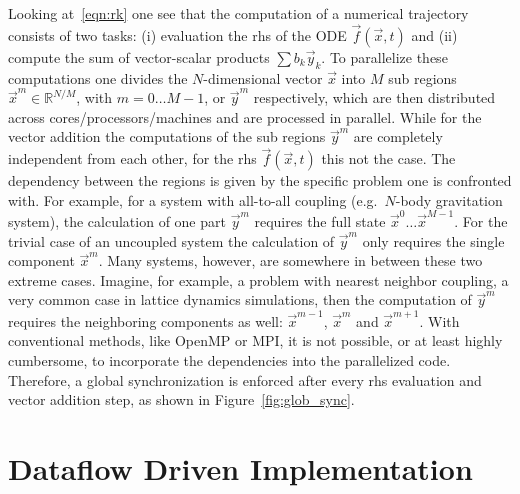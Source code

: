 \documentclass[10pt]{scrartcl}
\begin{document}
Looking at~\eqref{eqn:rk} one see that the computation of a numerical trajectory consists of two tasks: (i) evaluation the rhs of the ODE $\vec f(\vec x,t)$ and (ii) compute the sum of vector-scalar products $\sum b_k \vec y_k$.
To parallelize these computations one divides the $N$-dimensional vector $\vec x$ into $M$ sub regions $\vec x^{m}\in \mathbb{R}^{N/M}$, with $m=0\dots M-1$, or $\vec y^{m}$ respectively, which are then distributed across cores/processors/machines and are processed in parallel.
While for the vector addition the computations of the sub regions $\vec y^m$ are completely independent from each other, for the rhs $\vec f(\vec x , t)$ this not the case.
The dependency between the regions is given by the specific problem one is confronted with.
For example, for a system with all-to-all coupling (e.g.\ $N$-body gravitation system), the calculation of one part $\vec y^m$ requires the full state $\vec x^{0}\dots \vec x^{M-1}$.
For the trivial case of an uncoupled system the calculation of $\vec y^m$ only requires the single component $\vec x^m$.
Many systems, however, are somewhere in between these two extreme cases.
Imagine, for example, a problem with nearest neighbor coupling, a very common case in lattice dynamics simulations, then the computation of $\vec y^m$ requires the neighboring components as well: $\vec x^{m-1}$, $\vec x^{m}$ and $\vec x^{m+1}$.
With conventional methods, like OpenMP or MPI, it is not possible, or at least highly cumbersome, to incorporate the dependencies into the parallelized code.
Therefore, a global synchronization is enforced after every rhs evaluation and vector addition step, as shown in Figure~\ref{fig:glob_sync}.

\section{Dataflow Driven Implementation}
\end{document}

